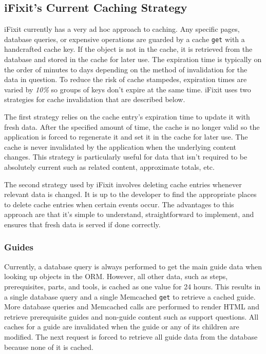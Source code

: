 \documentclass[12pt]{ucthesis}
\begin{document}
\subsection{iFixit's Current Caching Strategy}
\textsf{iFixit} currently has a very ad hoc approach to caching.
Any specific pages, database queries, or expensive operations are guarded by a cache {\tt get} with a handcrafted cache key.
If the object is not in the cache, it is retrieved from the database and stored in the cache for later use.
The expiration time is typically on the order of minutes to days depending on the method of invalidation for the data in question.
To reduce the risk of cache stampedes, expiration times are varied by \textit{10\%} so groups of keys don't expire at the same time.
\textsf{iFixit} uses two strategies for cache invalidation that are described below.

The first strategy relies on the cache entry's expiration time to update it with fresh data.
After the specified amount of time, the cache is no longer valid so the application is forced to regenerate it and set it in the cache for later use.
The cache is never invalidated by the application when the underlying content changes.
This strategy is particularly useful for data that isn't required to be absolutely current such as related content, approximate totals, etc.

The second strategy used by \textsf{iFixit} involves deleting cache entries whenever relevant data is changed.
It is up to the developer to find the appropriate places to delete cache entries when certain events occur.
The advantages to this approach are that it's simple to understand, straightforward to implement, and ensures that fresh data is served if done correctly.

\subsubsection{Guides}
Currently, a database query is always performed to get the main guide data when looking up objects in the ORM\@.
However, all other data, such as steps, prerequisites, parts, and tools, is cached as one value for 24 hours.
This results in a single database query and a single \textsf{Memcached} {\tt get} to retrieve a cached guide.
More database queries and \textsf{Memcached} calls are performed to render HTML and retrieve prerequisite guides and non-guide content such as support questions.
All caches for a guide are invalidated when the guide or any of its children are modified.
The next request is forced to retrieve all guide data from the database because none of it is cached.
\end{document}
